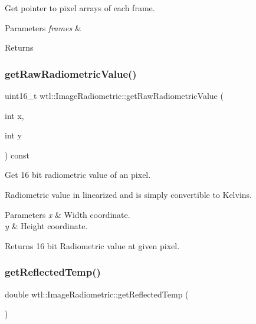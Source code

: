 Get pointer to pixel arrays of each frame. 


\begin{DoxyParams}{Parameters}
{\em frames} & \\
\hline
\end{DoxyParams}
\begin{DoxyReturn}{Returns}

\end{DoxyReturn}
\mbox{\label{classwtl_1_1_image_radiometric_a54944b28818ee3d347f9b462744d0e49}} 
\subsubsection{\texorpdfstring{get\+Raw\+Radiometric\+Value()}{getRawRadiometricValue()}}
{\footnotesize\ttfamily uint16\+\_\+t wtl\+::\+Image\+Radiometric\+::get\+Raw\+Radiometric\+Value (\begin{DoxyParamCaption}\item[{int}]{x,  }\item[{int}]{y }\end{DoxyParamCaption}) const}



Get 16 bit radiometric value of an pixel. 

Radiometric value in linearized and is simply convertible to Kelvins. 
\begin{DoxyParams}{Parameters}
{\em x} & Width coordinate. \\
\hline
{\em y} & Height coordinate. \\
\hline
\end{DoxyParams}
\begin{DoxyReturn}{Returns}
16 bit Radiometric value at given pixel. 
\end{DoxyReturn}
\mbox{\label{classwtl_1_1_image_radiometric_a32bbd3d1b9bbc4086218520bb1d5a16d}} 
\subsubsection{\texorpdfstring{get\+Reflected\+Temp()}{getReflectedTemp()}}
{\footnotesize\ttfamily double wtl\+::\+Image\+Radiometric\+::get\+Reflected\+Temp (\begin{DoxyParamCaption}{ }\end{DoxyParamCaption})}



